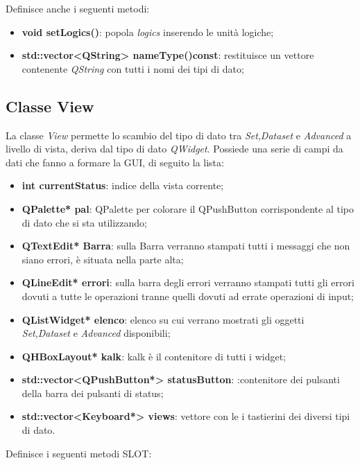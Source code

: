 \documentclass[a4paper,10pt]{article}
\begin{document}
        Definisce anche i seguenti metodi:
        \begin{itemize}
            \item \textbf{void setLogics()}: popola \textit{logics} inserendo le unità logiche;
            \item \textbf{std::vector<QString> nameType()const}: restituisce un vettore contenente \textit{QString} con tutti i nomi dei tipi di dato;
        \end{itemize}
        \subsection{Classe View}
        La classe \textit{View} permette lo scambio del tipo di dato tra \textit{Set},\textit{Dataset} e \textit{Advanced} a livello di vista, deriva dal tipo di dato \textit{QWidget}.
        Possiede una serie di campi da dati che fanno a formare la GUI, di seguito la lista:
        \begin{itemize}
            \item \textbf{int currentStatus}: indice della vista corrente;
            \item \textbf{QPalette* pal}: QPalette per colorare il QPushButton corrispondente al tipo di dato che si sta utilizzando;
            \item \textbf{QTextEdit* Barra}: sulla Barra verranno stampati tutti i messaggi che non siano errori, è situata nella parte alta;
            \item \textbf{QLineEdit* errori}: sulla barra degli errori verranno stampati tutti gli errori dovuti a tutte le operazioni tranne quelli dovuti ad errate operazioni di input;
            \item \textbf{QListWidget* elenco}: elenco su cui verrano mostrati gli oggetti \textit{Set},\textit{Dataset} e \textit{Advanced} disponibili;
            \item \textbf{QHBoxLayout* kalk}: kalk è il contenitore di tutti i widget;
            \item \textbf{std::vector<QPushButton*> statusButton}: :contenitore dei pulsanti della barra dei pulsanti di status;
            \item \textbf{std::vector<Keyboard*> views}: vettore con le i tastierini dei diversi tipi di dato.
        \end{itemize}
        Definisce i seguenti metodi SLOT:
\end{document}
